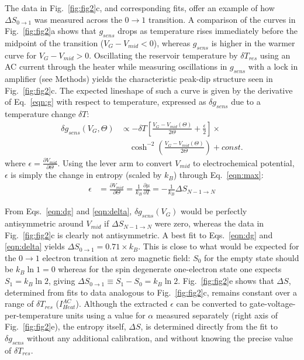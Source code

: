 \documentclass[twocolumn,showpacs,amsmath,amssymb,prl,aps,superscriptaddress]{revtex4-1}
\begin{document}
The data in Fig.~\ref{fig:fig2}c, and corresponding fits, offer an example of how $\Delta S_{0\rightarrow 1}$ was measured across the $0 \rightarrow 1$ transition.  A comparison of the curves in Fig.~\ref{fig:fig2}a shows that $g_{sens}$ drops as temperature rises immediately before the midpoint of the transition ($V_G-V_{mid}<0$), whereas $g_{sens}$ is higher in the warmer curve for $V_G-V_{mid}>0$.   Oscillating the reservoir temperature by $\delta T_{res}$ using an AC current through the heater while measuring oscillations in $g_{sens}$ with a lock in amplifier (see Methods) yields the characteristic peak-dip structure seen in Fig.~\ref{fig:fig2}c.  The expected lineshape of such a curve is given by the derivative of Eq.~\ref{eqn:g} with respect to temperature, expressed as $\delta g_{sens}$ due to a temperature change $\delta T$:
%
\begin{align}
\label{eqn:dg}
        \delta g_{sens}(V_G, \Theta) &\propto -\delta T \left[ \frac{V_G-V_{mid}(\Theta)}{2\Theta} + \frac{\epsilon}{2} \right]\times \\
        				      &\quad\cosh^{-2}\left(\frac{V_G-V_{mid}(\Theta)}{2\Theta}\right) + const. \nonumber
\end{align}
%
where $\epsilon=\frac{\partial V_{mid}}{\partial \Theta}$. Using the lever arm to convert $V_{mid}$ to electrochemical potential, $\epsilon$ is simply the change in entropy (scaled by $k_B$) through Eq.~\ref{eqn:max}:
%
\begin{align}
\label{eqn:epsilon}
        \epsilon &= \frac{\partial V_{mid}}{\partial \Theta} = 
        \frac{1}{k_B} \frac{\partial \mu}{\partial T} = 
        -\frac{1}{k_B} \Delta S_{N-1\rightarrow N}
\end{align}
%

From Eqs.~\ref{eqn:dg} and \ref{eqn:delta}, $\delta g_{sens}(V_G)$ would be perfectly antisymmetric around $V_{mid}$ if $\Delta S_{N-1\rightarrow N}$ were zero, whereas the data in Fig.~\ref{fig:fig2}c is clearly not antisymmetric. A best fit to Eqs.~\ref{eqn:dg} and \ref{eqn:delta} yields $\Delta S_{0\rightarrow 1}=0.71\times k_B$.  This is close to what would be expected for the $0 \rightarrow 1$ electron transition at zero magnetic field: $S_0$ for the empty state should be $k_B \ln{1}=0$ whereas for the spin degenerate one-electron state one expects $S_1=k_B\ln{2}$, giving $\Delta S_{0\rightarrow 1}\equiv S_1 - S_0 =k_B\ln{2}$. Fig.~\ref{fig:fig2}e shows that $\Delta S$,  determined from fits to data analogous to Fig.~\ref{fig:fig2}c, remains constant over a range of $\delta T_{res}$ ($I^{AC}_{Heat}$).  Although the extracted $\epsilon$ can be converted to gate-voltage-per-temperature units using a value for $\alpha$ measured separately (right axis of Fig.~\ref{fig:fig2}e), the entropy itself, $\Delta S$, is determined directly from the fit to $\delta g_{sens}$ without any additional calibration, and without knowing the precise value of $\delta T_{res}$.
\end{document}
